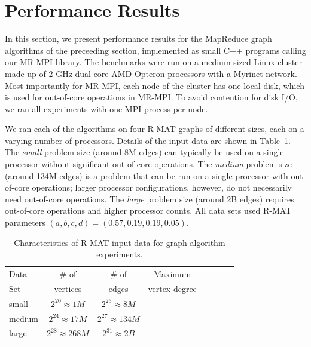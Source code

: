 \section{Performance Results}
\label{sec:results}

In this section, we present performance results for the MapReduce
graph algorithms of the preceeding section, implemented as small C++
programs calling our MR-MPI library.
The benchmarks were run on a medium-sized Linux cluster made up of 2 GHz
dual-core AMD Opteron processors with a Myrinet network.  Most importantly
for MR-MPI, each node of the cluster has one local disk, which is used
for out-of-core operations in MR-MPI.  To avoid contention for disk I/O, we 
ran all experiments with one MPI process per node.

We ran each of the algorithms on four R-MAT graphs of
different sizes, each on a varying number of processors.  Details of the
input data are shown in Table~\ref{t:rmats}.
The {\it small} problem size (around 8M edges) can typically be used
on a single processor without significant out-of-core operations.
The {\it medium} problem size (around 134M edges) is a 
problem that can be run
on a single processor with out-of-core operations; larger processor 
configurations, however, do not necessarily need out-of-core operations.
The {\it large} problem size (around 2B
edges) requires out-of-core operations and higher processor counts.
All data sets used R-MAT parameters $(a, b, c, d) = (0.57, 0.19, 0.19, 0.05)$.

\begin{table}
\begin{tabular}{|l|c|c|c|c|c|c|c|}
\hline
Data & \# of    & \# of & Maximum \\
Set  & vertices & edges & vertex degree\\
\hline
small   &$2^{20} \approx 1M$ & $2^{23} \approx 8M$ &   \\
medium  &$2^{24} \approx 17M$ & $2^{27} \approx 134M$ &   \\
large   &$2^{28} \approx 268M$ & $2^{31} \approx 2B$&   \\
\hline
\end{tabular}
\caption{Characteristics of R-MAT input data for graph algorithm
experiments.}
\label{t:rmats}
\end{table}

